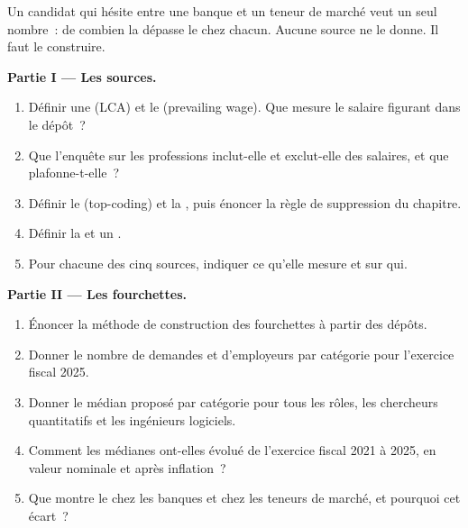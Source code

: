 \begin{problem}\label{pb:in:pay-levels-by-role-firm-type-and-seniority:1}
Un candidat qui hésite entre une banque et un teneur de marché veut un seul nombre~: de combien la  dépasse le  chez chacun.
Aucune source ne le donne. Il faut le construire.

\medskip\noindent\textbf{Partie I --- Les sources.}
\begin{enumerate}
\item Définir une  (LCA) et le  (prevailing wage). Que mesure le salaire figurant dans le dépôt~?
\item Que l'enquête sur les professions inclut-elle et exclut-elle des salaires, et que plafonne-t-elle~?
\item Définir le  (top-coding) et la , puis énoncer la règle de suppression du chapitre.
\item Définir la  et un .
\item Pour chacune des cinq sources, indiquer ce qu'elle mesure et sur qui.
\end{enumerate}

\medskip\noindent\textbf{Partie II --- Les fourchettes.}
\begin{enumerate}[resume]
\item Énoncer la méthode de construction des fourchettes à partir des dépôts.
\item Donner le nombre de demandes et d'employeurs par catégorie pour l'exercice fiscal 2025.
\item Donner le  médian proposé par catégorie pour tous les rôles, les chercheurs quantitatifs et les ingénieurs logiciels.
\item Comment les médianes ont-elles évolué de l'exercice fiscal 2021 à 2025, en valeur nominale et après inflation~?
\item Que montre le  chez les banques et chez les teneurs de marché, et pourquoi cet écart~?
\end{enumerate}


\end{problem}
